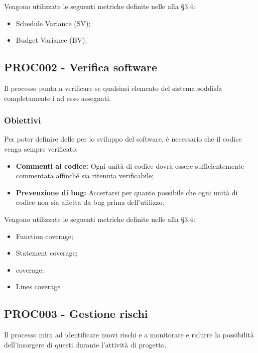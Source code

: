 \documentclass[PianoDiQualifica.tex]{subfiles}
\begin{document}
Vengono utilizzate le seguenti metriche definite nelle \ndp alla \S{3.4}:
\begin{itemize}
	\item {} Schedule Variance (SV);
	\item {} Budget Variance (BV).
\end{itemize}

\subsection{PROC002 - Verifica software}
Il processo punta a verificare se qualsiasi elemento del sistema soddisfa completamente i  ad esso assegnati.
\subsubsection{Obiettivi}
Per poter definire delle  per lo sviluppo del software, è necessario che il codice venga sempre verificato:
\begin{itemize}
	\item \textbf{Commenti al codice:} Ogni unità di codice dovrà essere sufficientemente commentata affinché sia ritenuta verificabile;
	\item \textbf{Prevenzione di bug:} Accertarsi per quanto possibile che ogni unità di codice non sia affetta da bug prima dell'utilizzo.
\end{itemize}
Vengono utilizzate le seguenti metriche definite nelle \ndp alla \S{3.4}:
\begin{itemize}
	\item {} Function coverage;
	\item {} Statement coverage;
	\item {}  coverage;
	\item {} Lines coverage
\end{itemize}

	\subsection{PROC003 - Gestione rischi}
Il processo mira ad identificare nuovi rischi e a monitorare e ridurre la possibilità dell'insorgere di questi durante l'attività di progetto.
\end{document}
